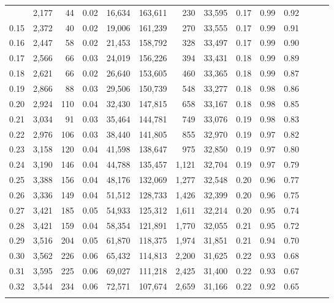 \begin{tabular}{rrrrrrrrrrrrrr}
\begin{comment}
0.14 &  2,177 &   44 &  0.02 &   16,634 &  163,611 &     230 &  33,595 &  0.17 &  0.99 &      0.92 \\
0.15 &  2,372 &   40 &  0.02 &   19,006 &  161,239 &     270 &  33,555 &  0.17 &  0.99 &      0.91 \\
0.16 &  2,447 &   58 &  0.02 &   21,453 &  158,792 &     328 &  33,497 &  0.17 &  0.99 &      0.90 \\
0.17 &  2,566 &   66 &  0.03 &   24,019 &  156,226 &     394 &  33,431 &  0.18 &  0.99 &      0.89 \\
0.18 &  2,621 &   66 &  0.02 &   26,640 &  153,605 &     460 &  33,365 &  0.18 &  0.99 &      0.87 \\
0.19 &  2,866 &   88 &  0.03 &   29,506 &  150,739 &     548 &  33,277 &  0.18 &  0.98 &      0.86 \\
0.20 &  2,924 &  110 &  0.04 &   32,430 &  147,815 &     658 &  33,167 &  0.18 &  0.98 &      0.85 \\
0.21 &  3,034 &   91 &  0.03 &   35,464 &  144,781 &     749 &  33,076 &  0.19 &  0.98 &      0.83 \\
0.22 &  2,976 &  106 &  0.03 &   38,440 &  141,805 &     855 &  32,970 &  0.19 &  0.97 &      0.82 \\
0.23 &  3,158 &  120 &  0.04 &   41,598 &  138,647 &     975 &  32,850 &  0.19 &  0.97 &      0.80 \\
0.24 &  3,190 &  146 &  0.04 &   44,788 &  135,457 &   1,121 &  32,704 &  0.19 &  0.97 &      0.79 \\
0.25 &  3,388 &  156 &  0.04 &   48,176 &  132,069 &   1,277 &  32,548 &  0.20 &  0.96 &      0.77 \\
0.26 &  3,336 &  149 &  0.04 &   51,512 &  128,733 &   1,426 &  32,399 &  0.20 &  0.96 &      0.75 \\
0.27 &  3,421 &  185 &  0.05 &   54,933 &  125,312 &   1,611 &  32,214 &  0.20 &  0.95 &      0.74 \\
0.28 &  3,421 &  159 &  0.04 &   58,354 &  121,891 &   1,770 &  32,055 &  0.21 &  0.95 &      0.72 \\
0.29 &  3,516 &  204 &  0.05 &   61,870 &  118,375 &   1,974 &  31,851 &  0.21 &  0.94 &      0.70 \\
0.30 &  3,562 &  226 &  0.06 &   65,432 &  114,813 &   2,200 &  31,625 &  0.22 &  0.93 &      0.68 \\
0.31 &  3,595 &  225 &  0.06 &   69,027 &  111,218 &   2,425 &  31,400 &  0.22 &  0.93 &      0.67 \\
0.32 &  3,544 &  234 &  0.06 &   72,571 &  107,674 &   2,659 &  31,166 &  0.22 &  0.92 &      0.65 \\

\end{comment}
\end{tabular}
